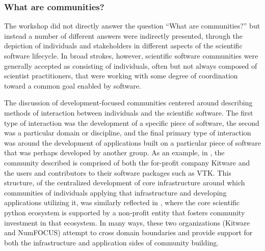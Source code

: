 \documentclass[11pt, oneside]{amsart}
\newcommand{\toolname}[1] {\textsf{#1}}
\begin{document}

\subsubsection{What are communities?}

The workshop did not directly answer the question ``What are communities?'' but
instead a number of different answers were indirectly presented, through the
depiction of individuals and stakeholders in different aspects of the
scientific software lifecycle.  In broad strokes, however, scientific software
communities were generally accepted as consisting of individuals, often but not
always composed of scientist practitioners, that were working with some degree
of coordination toward a common goal enabled by software.

The discussion of development-focused communities centered around describing
methods of interaction between individuals and the scientific software.  The
first type of interaction was the development of a specific piece of software,
the second was a particular domain or discipline, and the final primary
type of interaction was around the development of applications built on a
particular piece of software that was perhaps developed by another group.  As
an example, in \cite{Hanwell_WSSSPE}, the community described is comprised of
both the for-profit company \toolname{Kitware} and the users and contributors to their
software packages such as \toolname{VTK}.  This structure, of the centralized development
of core infrastructure around which communities of individuals applying that
infrastructure and developing applications utilizing it, was similarly
reflected in \cite{Terrel_WSSSPE}, where the core scientific python ecosystem
is supported by a non-profit entity that fosters community investment in that
ecosystem.  In many ways, these two organizations (\toolname{Kitware} and \toolname{NumFOCUS})
attempt to cross domain boundaries and provide support for both the
infrastructure and application sides of community building.
\end{document}
